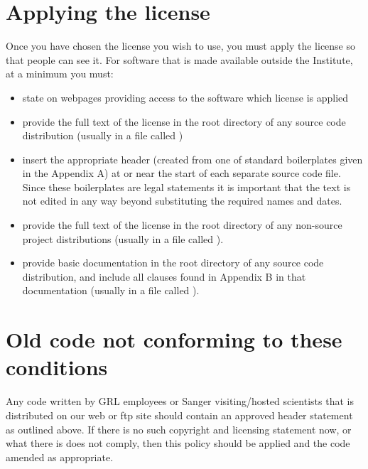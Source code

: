\documentclass[10pt,a4paper]{article}
\begin{document}
\section{Applying the license}

Once you have chosen the license you wish to use, you must apply the license so that 
people can see it. For software that is made available outside the Institute, at a 
minimum you must:

\begin{itemize}
\item state on webpages providing access to the software which license is applied 
\item provide the full text of the license in the root directory of any source code 
distribution (usually in a file called ) 
\item insert the appropriate header (created from one of standard boilerplates given in 
the Appendix A) at or near the start of each separate source code file. Since these 
boilerplates are legal statements it is important that the text is not edited in any 
way beyond substituting the required names and dates.
\item provide the full text of the license in the root directory of any non-source project 
distributions (usually in a file called ). 
\item provide basic documentation in the root directory of any source code 
distribution, and include all clauses found in Appendix B in that documentation 
(usually in a file called ). 
\end{itemize}


\section{Old code not conforming to these conditions}

Any code written by GRL employees or Sanger visiting/hosted scientists that is 
distributed on our web or ftp site should contain an approved header statement as 
outlined above. If there is no such copyright and licensing statement now, or what 
there is does not comply, then this policy should be applied and the code amended as 
appropriate. 


\end{document}
